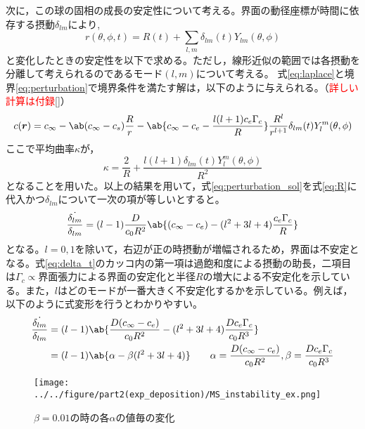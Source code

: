 \documentclass[autodetect-engine,dvi=dvipdfmx,a4paper,ja=standard,oneside,openany,11pt,draft]{bxjsbook}
\begin{document}
次に，この球の固相の成長の安定性について考える。界面の動径座標が時間に依存する摂動$\delta_{lm}$により,
\begin{equation}
  r(\theta,\phi,t) = R(t) + \sum_{l,m} \delta_{lm}(t)Y_{lm}(\theta,\phi)
  \label{eq:perturbation}
\end{equation}
と変化したときの安定性を以下で求める。ただし，線形近似の範囲では各摂動を分離して考えられるのであるモード$(l,m)$について考える。
式\ref{eq:laplace}と境界\ref{eq:perturbation}で境界条件を満たす解は，以下のように与えられる。（\textcolor{red}{詳しい計算は付録\ref{}}）
\begin{equation}
  \begin{split}
    c(\bm{r})=c_{\infty}-\ab(c_{\infty}-c_s)\frac{R}{r}-\ab\{c_\infty-c_e-\frac{l(l+1)c_e\Gamma_c}{R}\}\frac{R^l}{r^{l+1}}\delta_{lm}(t)Y_{l}^{m}(\theta,\phi)
  \end{split}
  \label{eq:perturbation_sol}
\end{equation}
ここで平均曲率$\kappa$が，
\begin{equation}
  \kappa = \frac{2}{R}+\frac{l(l+1)\delta_{lm}(t)Y_l^m(\theta,\phi)}{R^2}
  \label{eq:perturbation_curvature}
\end{equation}
となることを用いた。以上の結果を用いて，式\ref{eq:perturbation_sol}を式\ref{eq:R}に代入かつ$\delta_{lm}$について一次の項が等しいとすると。
\begin{equation}
  \frac{\dot{\delta_{lm}}}{\delta_{lm}} =(l-1)\frac{D}{c_0R^2}\ab\{(c_\infty-c_e)-(l^2+3l+4)\frac{c_e\Gamma_c}{R}\}
  \label{eq:delta_t}
\end{equation}
となる。$l=0,1$を除いて，右辺が正の時摂動が増幅されるため，界面は不安定となる。式\ref{eq:delta_t}のカッコ内の第一項は過飽和度による摂動の助長，二項目は$\Gamma_c\propto$界面張力による界面の安定化と半径$R$の増大による不安定化を示している。また，$l$はどのモードが一番大きく不安定化するかを示している。例えば，以下のように式変形を行うとわかりやすい。
\begin{equation}
  \begin{split}
    \frac{\dot{\delta_{lm}}}{\delta_{lm}} & =(l-1)\ab\{\frac{D(c_\infty-c_e)}{c_0R^2}-(l^2+3l+4)\frac{D c_e\Gamma_c}{c_0 R^3}\}                                  \\
                                          & =(l-1)\ab\{\alpha-\beta(l^2+3l+4)\} \qquad \alpha=\frac{D(c_\infty-c_e)}{c_0R^2},\beta=\frac{D c_e\Gamma_c}{c_0 R^3}
  \end{split}
  \label{eq:delta_t_simple}
\end{equation}
\begin{figure}
  \centering
  \texttt{[image: ../../figure/part2(exp\_deposition)/MS\_instability\_ex.png]}
  \caption{$\beta=0.01$の時の各$\alpha$の値毎の変化}
  \label{fig:MS_instability_ex}
\end{figure}
\end{document}
